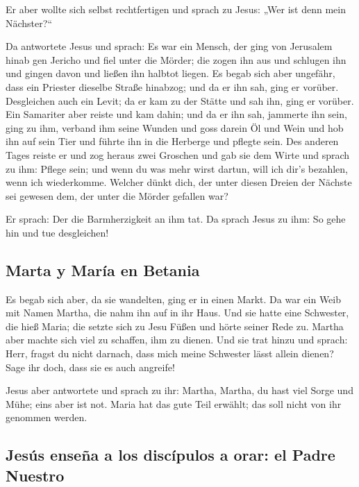  Er aber wollte sich selbst rechtfertigen und sprach zu
Jesus: „Wer ist denn mein Nächster?{}``

 Da antwortete Jesus und sprach: Es war ein Mensch, der
ging von Jerusalem hinab gen Jericho und fiel unter die Mörder; die
zogen ihn aus und schlugen ihn und gingen davon und ließen ihn halbtot
liegen.  Es begab sich aber ungefähr, dass ein Priester
dieselbe Straße hinabzog; und da er ihn sah, ging er vorüber.
 Desgleichen auch ein Levit; da er kam zu der Stätte und
sah ihn, ging er vorüber.  Ein Samariter aber reiste und
kam dahin; und da er ihn sah, jammerte ihn sein,  ging zu
ihm, verband ihm seine Wunden und goss darein Öl und Wein und hob ihn
auf sein Tier und führte ihn in die Herberge und pflegte sein.
 Des anderen Tages reiste er und zog heraus zwei Groschen
und gab sie dem Wirte und sprach zu ihm: Pflege sein; und wenn du was
mehr wirst dartun, will ich dir's bezahlen, wenn ich wiederkomme.
 Welcher dünkt dich, der unter diesen Dreien der Nächste
sei gewesen dem, der unter die Mörder gefallen war?

 Er sprach: Der die Barmherzigkeit an ihm tat. Da sprach
Jesus zu ihm: So gehe hin und tue desgleichen!

\hypertarget{marta-y-maruxeda-en-betania}{%
\subsection{Marta y María en
Betania}\label{marta-y-maruxeda-en-betania}}

 Es begab sich aber, da sie wandelten, ging er in einen
Markt. Da war ein Weib mit Namen Martha, die nahm ihn auf in ihr Haus.
 Und sie hatte eine Schwester, die hieß Maria; die setzte
sich zu Jesu Füßen und hörte seiner Rede zu.  Martha aber
machte sich viel zu schaffen, ihm zu dienen. Und sie trat hinzu und
sprach: Herr, fragst du nicht darnach, dass mich meine Schwester lässt
allein dienen? Sage ihr doch, dass sie es auch angreife!

 Jesus aber antwortete und sprach zu ihr: Martha, Martha,
du hast viel Sorge und Mühe;  eins aber ist not. Maria
hat das gute Teil erwählt; das soll nicht von ihr genommen werden.

\hypertarget{jesuxfas-enseuxf1a-a-los-discuxedpulos-a-orar-el-padre-nuestro}{%
\subsection{Jesús enseña a los discípulos a orar: el Padre
Nuestro}\label{jesuxfas-enseuxf1a-a-los-discuxedpulos-a-orar-el-padre-nuestro}}

